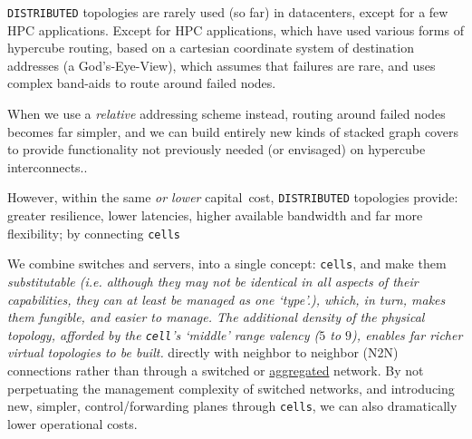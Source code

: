 \documentclass[../../../OAE-SPEC-MAIN.tex]{subfiles}
\begin{document}
%
\texttt{DISTRIBUTED} topologies are rarely used (so far) in datacenters, except for a few HPC applications. Except for HPC applications, which have used various forms of hypercube routing, based on a cartesian coordinate system of destination addresses (a God's-Eye-View), which assumes that failures are rare, and uses complex band-aids to route around failed nodes. 

When we use a \emph{relative} addressing scheme instead, routing around failed nodes becomes far simpler, and we can build entirely new kinds of stacked graph covers to provide functionality not previously needed (or envisaged) on hypercube interconnects.. 

However, within the same \emph{or lower} capital~cost, \texttt{DISTRIBUTED} topologies provide: greater resilience, lower latencies, higher available bandwidth and far more flexibility; by connecting \texttt{cells}

We combine switches and servers, into a single concept:  \texttt{cells}, and make them \emph{substitutable (i.e. although they may not be identical in all aspects of their capabilities, they can at least be managed as one `type'.), which, in turn, makes them \emph{fungible}, and easier to manage. The additional density of the physical topology, afforded by the \texttt{cell}'s  `middle' range valency ($5$ to $9$), enables far richer virtual topologies to be built.} directly with neighbor to neighbor (N2N) %
connections rather than through a switched or \href{http://www.plexxi.com/2013/07/the-problem-with-everything-in-aggregation/}{aggregated} network. By not perpetuating the management complexity of switched networks, and introducing new, simpler, control/forwarding planes through \texttt{cells}, we can also dramatically lower  operational costs. 

\end{document}
